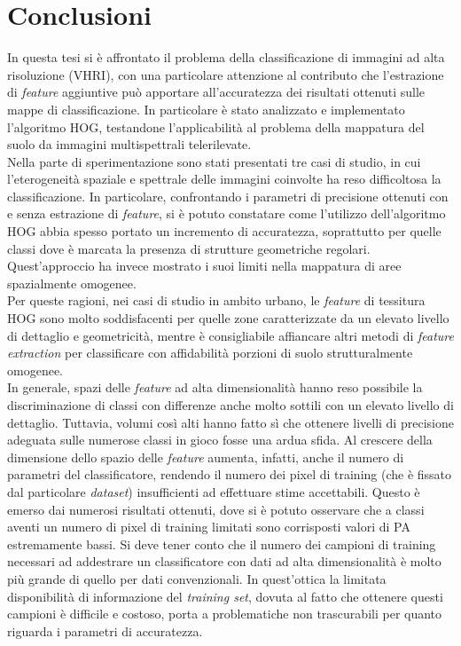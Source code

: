 

\chapter{Conclusioni}
\label{cap:conclusioni}

In questa tesi si è affrontato il problema della classificazione di immagini ad alta risoluzione (VHRI), con una particolare attenzione al contributo che l'estrazione di \emph{feature} aggiuntive può apportare all'accuratezza dei risultati ottenuti sulle mappe di classificazione.
In particolare è stato analizzato e implementato l'algoritmo HOG, testandone l'applicabilità al problema della mappatura del suolo da immagini multispettrali telerilevate.\\
Nella parte di sperimentazione sono stati presentati tre casi di studio, in cui l'eterogeneità spaziale e spettrale delle immagini coinvolte ha reso difficoltosa la classificazione. In particolare, confrontando i parametri di precisione ottenuti con e senza estrazione di \emph{feature}, si è potuto constatare come l'utilizzo dell'algoritmo HOG abbia spesso portato un incremento di accuratezza, soprattutto per  quelle  classi dove è marcata la presenza di strutture geometriche regolari. Quest'approccio ha invece mostrato i suoi limiti nella mappatura di aree spazialmente omogenee.\\
Per queste ragioni, nei casi di studio in ambito urbano, le \emph{feature} di tessitura HOG sono molto soddisfacenti per quelle zone caratterizzate da un elevato livello di dettaglio e geometricità, mentre è consigliabile affiancare altri metodi di \emph{feature extraction} per classificare con affidabilità porzioni di suolo strutturalmente omogenee.\\
In generale, spazi delle \emph{feature} ad alta dimensionalità hanno reso possibile la discriminazione di classi con differenze anche molto sottili con un elevato livello di dettaglio. Tuttavia, volumi così alti hanno fatto sì che ottenere livelli di precisione adeguata sulle numerose classi in gioco  fosse una ardua sfida. Al crescere della dimensione dello spazio delle \emph{feature} aumenta, infatti, anche il numero di parametri del classificatore, rendendo il numero dei pixel di training (che è fissato dal particolare \emph{dataset}) insufficienti ad effettuare stime accettabili. Questo è emerso dai numerosi risultati ottenuti, dove si è potuto osservare che a classi aventi un numero di pixel di training limitati sono corrisposti valori di PA estremamente bassi.  Si deve tener conto che  il numero dei campioni di training necessari ad addestrare un classificatore con dati ad alta dimensionalità è molto più grande di quello per dati convenzionali. In quest'ottica la limitata disponibilità di informazione del \emph{training set}, dovuta al fatto che ottenere questi campioni è difficile e costoso,  porta a problematiche non trascurabili per quanto riguarda i parametri di accuratezza.\\

